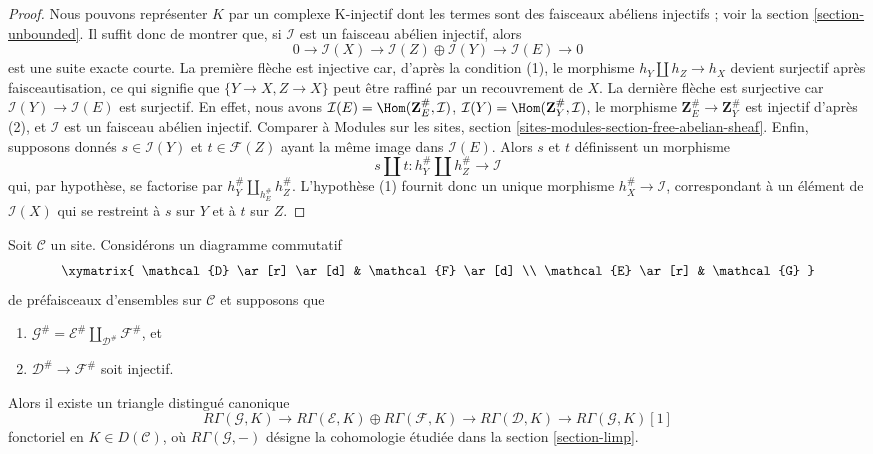 \begin{proof}
Nous pouvons représenter $K$ par un complexe K-injectif dont les termes
sont des faisceaux abéliens injectifs ; voir la section
\ref{section-unbounded}. Il suffit donc de montrer que, si $\mathcal{I}$
est un faisceau abélien injectif, alors
$$
0 \to \mathcal{I}(X) \to
\mathcal{I}(Z) \oplus \mathcal{I}(Y) \to
\mathcal{I}(E) \to 0
$$
est une suite exacte courte. La première flèche est injective car, d'après
la condition (1), le morphisme $h_Y \amalg h_Z \to h_X$ devient surjectif
après faisceautisation, ce qui signifie que
$\{Y \to X, Z \to X\}$ peut être raffiné par un recouvrement de $X$. La
dernière flèche est surjective car
$\mathcal{I}(Y) \to \mathcal{I}(E)$ est surjectif. En effet, nous avons
$\mathcal{I}(E) = \Hom(\mathbf{Z}_E^\#, \mathcal{I})$,
$\mathcal{I}(Y) = \Hom(\mathbf{Z}_Y^\#, \mathcal{I})$,
le morphisme $\mathbf{Z}_E^\# \to \mathbf{Z}_Y^\#$ est injectif d'après
(2), et $\mathcal{I}$ est un faisceau abélien injectif. Comparer à Modules
sur les sites, section
\ref{sites-modules-section-free-abelian-sheaf}.
Enfin, supposons donnés $s \in \mathcal{I}(Y)$ et
$t \in \mathcal{F}(Z)$ ayant la même image dans $\mathcal{I}(E)$. Alors
$s$ et $t$ définissent un morphisme
$$
s \amalg t : h_Y^\# \amalg h_Z^\# \longrightarrow \mathcal{I}
$$
qui, par hypothèse, se factorise par
$h_Y^\# \amalg_{h_E^\#} h_Z^\#$. L'hypothèse (1) fournit donc un unique
morphisme $h_X^\# \to \mathcal{I}$, correspondant à un élément de
$\mathcal{I}(X)$ qui se restreint à $s$ sur $Y$ et à $t$ sur $Z$.
\end{proof}

\begin{lemma}
\label{lemma-square-triangle-general}
Soit $\mathcal{C}$ un site. Considérons un diagramme commutatif
$$
\xymatrix{
\mathcal{D} \ar[r] \ar[d] & \mathcal{F} \ar[d] \\
\mathcal{E} \ar[r] & \mathcal{G}
}
$$
de préfaisceaux d'ensembles sur $\mathcal{C}$ et supposons que
\begin{enumerate}
\item $\mathcal{G}^\# =
\mathcal{E}^\# \amalg_{\mathcal{D}^\#} \mathcal{F}^\#$, et
\item $\mathcal{D}^\# \to \mathcal{F}^\#$ soit injectif.
\end{enumerate}
Alors il existe un triangle distingué canonique
$$
R\Gamma(\mathcal{G}, K) \to
R\Gamma(\mathcal{E}, K) \oplus
R\Gamma(\mathcal{F}, K) \to
R\Gamma(\mathcal{D}, K) \to
R\Gamma(\mathcal{G}, K)[1]
$$
fonctoriel en $K \in D(\mathcal{C})$, où $R\Gamma(\mathcal{G}, -)$ désigne
la cohomologie étudiée dans la section \ref{section-limp}.
\end{lemma}

